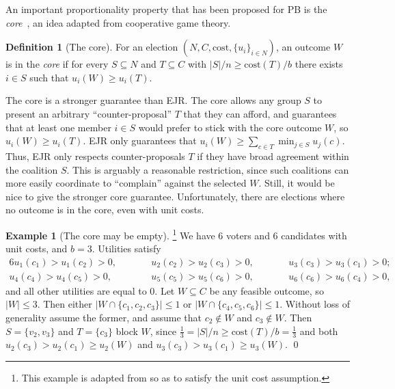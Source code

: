 \documentclass[10pt]{scrartcl}
\renewcommand*{\le}{\leqslant}
\renewcommand*{\ge}{\geqslant}
\renewcommand*{\geq}{\geqslant}
\newcommand{\myemph}[1]{{\color{winered}\emph{#1}}}
\newcommand{\cost}{{{\mathrm{cost}}}}
\theoremstyle{definition}
\newtheorem{definition}{Definition}
\newtheorem{example}{Example}
\theoremstyle{plain}
\begin{document}
An important proportionality property that has been proposed for PB is the \emph{core}~\citep{justifiedRepresentation,fain2018fair}, an idea adapted from cooperative game theory. 


\begin{definition}[The core]\label{def:core}
	For an election $(N, C, \cost, \{u_i\}_{i \in N})$, an outcome $W$ is in the \myemph{core} if for every $S \subseteq N$ and $T \subseteq C$ with $|S|/n \geq \cost(T)/b$ there exists $i \in S$ such that $u_i(W) \geq u_i(T)$.
\end{definition}

The core is a stronger guarantee than EJR. The core allows any group $S$ to present an arbitrary ``counter-proposal'' $T$ that they can afford, and guarantees that at least one member $i \in S$ would prefer to stick with the core outcome $W$, so $u_i(W) \geq u_i(T)$. EJR only guarantees that $u_i(W) \geq \sum_{c\in T} \min_{j\in S} u_j(c)$. Thus, EJR only respects counter-proposals $T$ if they have broad agreement within the coalition $S$. This is arguably a reasonable restriction, since such coalitions can more easily coordinate to ``complain'' against the selected $W$. Still, it would be nice to give the stronger core guarantee.
Unfortunately, there are elections where no outcome  is in the core, even with unit costs.

\begin{example}[The core may be empty]\!\!\!\footnote{This example is adapted from \citet[Appendix~C]{fain2018fair} so as to satisfy the unit cost assumption.} We have 6 voters and 6 candidates with unit costs, and $b = 3$. Utilities satisfy
	\begin{alignat*}{6}
		u_1(c_1) > u_1(c_2) > 0, \qquad
		&& u_2(c_2) > u_2(c_3) > 0, \qquad
		&& u_3(c_3) > u_3(c_1) > 0; \\
		u_4(c_4) > u_4(c_5) > 0, \qquad
		&& u_5(c_5) > u_5(c_6) > 0, \qquad
		&& u_6(c_6) > u_6(c_4) > 0,
	\end{alignat*}
	and all other utilities are equal to 0. Let $W \subseteq C$ be any feasible outcome, so $|W| \le 3$. Then either $|W \cap \{c_1, c_2, c_3\}| \le 1$ or $|W \cap \{c_4, c_5, c_6\}| \le 1$. Without loss of generality assume the former, and assume that $c_2 \not \in W$ and $c_3 \not\in W$. Then $S = \{v_2, v_3\}$ and $T = \{c_3\}$ block $W$, since $\frac13 = |S|/n \ge \cost(T) / b = \frac13$ and both $u_2(c_3) > u_2(c_1) \ge u_2(W)$ and $u_3(c_3) > u_3(c_1)\ge u_3(W)$. \qed
\end{example}
\end{document}
